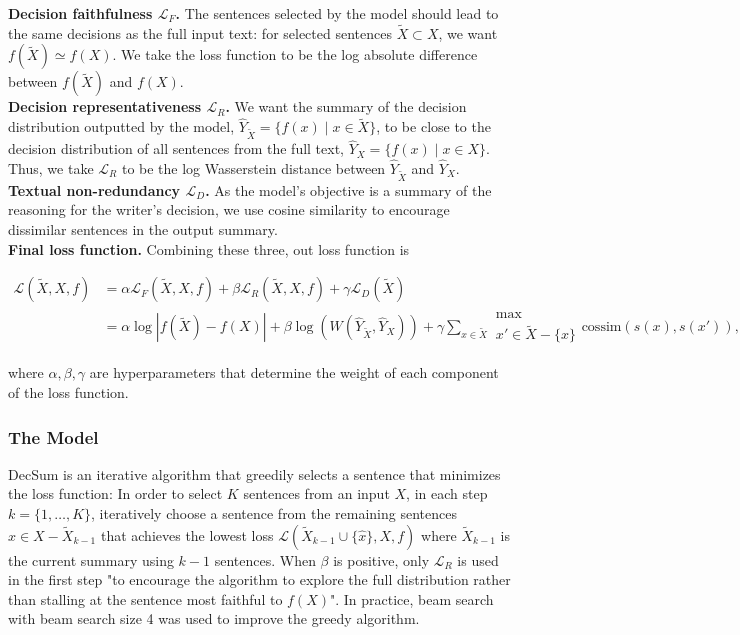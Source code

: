 \documentclass{article}
\begin{document}
\textbf{Decision faithfulness $\mathcal{L}_F$.} The sentences selected by the model should lead to the same decisions as the full input text: for selected sentences $\tilde{X}\subset X$, we want
$f(\tilde{X})\simeq f(X)$. We take the loss function to be the log absolute difference between $f(\tilde{X})$ and $f(X)$. \\
\textbf{Decision representativeness $\mathcal{L}_R$.} We want the summary of the decision distribution outputted by the model, $\hat{Y}_{\tilde{X}} = \{f(x)\mid x\in\tilde{X}\}$, to be close to the decision
distribution of all sentences from the full text, $\hat{Y}_X = \{f(x)\mid x \in X\}$. Thus, we take $\mathcal{L}_R$ to be the log Wasserstein distance between $\hat{Y}_{\tilde{X}}$ and
$\hat{Y}_{X}$. \\
\textbf{Textual non-redundancy $\mathcal{L}_D$.} As the model's objective is a summary of the reasoning for the writer's decision, we use cosine similarity to encourage dissimilar sentences in the
output summary. \\

\abovedisplayskip=0pt
\textbf{Final loss function.} Combining these three, out loss function is

\begin{align*}
    \mathcal{L}(\tilde{X}, X, f)    &= \alpha\mathcal{L}_F (\tilde{X}, X, f) + \beta\mathcal{L}_R (\tilde{X}, X, f) + \gamma\mathcal{L}_D (\tilde{X}) \\
                                    &= \alpha\log{|f(\tilde{X}) - f(X)|} + \beta\log{(W(\hat{Y}_{\tilde{X}}, \hat{Y}_X))}
                                    + \gamma\sum_{x\in\tilde{X}}\substack{\text{max}\\ x'\in \tilde{X} - \{x\}} \text{cossim}(s(x), s(x')),
\end{align*}
\belowdisplayskip=0pt

where $\alpha, \beta, \gamma$ are hyperparameters that determine the weight of each component of the loss function.

\subsubsection{The Model}
DecSum is an iterative algorithm that greedily selects a sentence that minimizes the loss function: In order to select $K$ sentences from an input $X$, in each step $k=\{1, \dots, K\}$, iteratively
choose a sentence from the remaining sentences $\hat{x}\in X - \tilde{X}_{k-1}$ that achieves the lowest loss $\mathcal{L}(\tilde{X}_{k-1}\cup \{\hat{x}\}, X, f)$ where $\tilde{X}_{k-1}$ is the current
summary using $k-1$ sentences. When $\beta$ is positive, only $\mathcal{L}_R$ is used in the first step "to encourage the algorithm to explore the full distribution rather than stalling at the sentence
most faithful to $f(X)$". In practice, beam search with beam search size 4 was used to improve the greedy algorithm.
\end{document}
